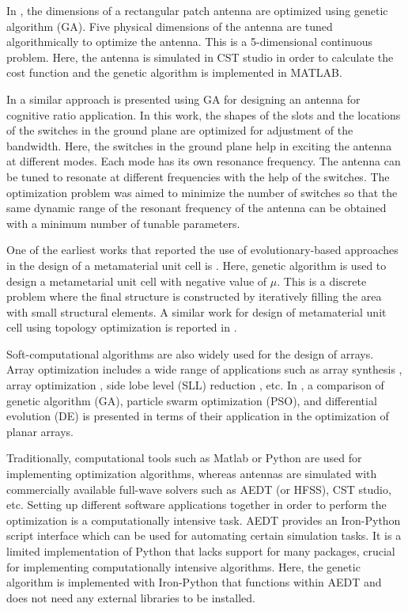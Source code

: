 In \cite{patch_miniaturize_ga}, the dimensions of a rectangular patch antenna are optimized using genetic algorithm (GA). Five physical dimensions of the antenna are tuned algorithmically to optimize the antenna. This is a 5-dimensional continuous problem. Here, the antenna is simulated in CST studio in order to calculate the cost function and the genetic algorithm is implemented in MATLAB.

In \cite{freqReconfCogn} a similar approach is presented using GA for designing an antenna for cognitive ratio application. In this work, the shapes of the slots and the locations of the switches in the ground plane are optimized for adjustment of the bandwidth. Here, the switches in the ground plane help in exciting the antenna at different modes. Each mode has its own resonance frequency. The antenna can be tuned to resonate at different frequencies with the help of the switches. The optimization problem was aimed to minimize the number of switches so that the same dynamic range of the resonant frequency of the antenna can be obtained with a minimum number of tunable parameters.

One of the earliest works that reported the use of evolutionary-based approaches in the design of a metamaterial unit cell is \cite{optMtm}. Here, genetic algorithm is used to design a metametarial unit cell with negative value of $\mu$. This is a discrete problem where the final structure is constructed by iteratively filling the area with small structural elements. A similar work for design of metamaterial unit cell using topology optimization is reported in \cite{lh_mtm}.

Soft-computational algorithms are also widely used for the design of arrays. Array optimization includes a wide range of applications such as array synthesis \cite{arraySynth1, arrayThin1}, array optimization \cite{arraySynth3}, side lobe level (SLL) reduction \cite{arraySynth2, arraySynth4}, etc. In \cite{compCAD4Arry}, a comparison of genetic algorithm (GA), particle swarm optimization (PSO), and differential evolution (DE) is presented in terms of their application in the optimization of planar arrays.

Traditionally, computational tools such as Matlab or Python are used for implementing optimization algorithms, whereas antennas are simulated with commercially available full-wave solvers such as AEDT (or HFSS), CST studio, etc. Setting up different software applications together in order to perform the optimization is a computationally intensive task. AEDT provides an Iron-Python script interface which can be used for automating certain simulation tasks. It is a limited implementation of Python that lacks support for many packages, crucial for implementing computationally intensive algorithms. Here, the genetic algorithm is implemented with Iron-Python that functions within AEDT and does not need any external libraries to be installed.

